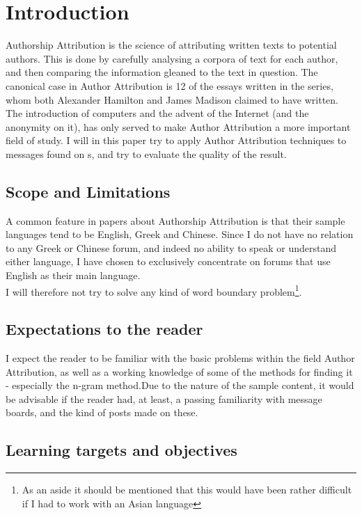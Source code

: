 \section{Introduction}

Authorship Attribution is the science of attributing written texts to potential authors. This is done by carefully analysing a corpora of text for each author, and then comparing the information gleaned to the text in question. The canonical case in Author Attribution is 12 of the essays written in the  series, whom both Alexander Hamilton and James Madison claimed to have written. The introduction of computers and the advent of the Internet (and the anonymity on it), has only served to make Author Attribution a more important field of study. I will in this paper try to apply Author Attribution techniques to messages found on \forum s, and try to evaluate the quality of the result.  

\subsection{Scope and Limitations}
A common feature in papers about Authorship Attribution is that their sample languages tend to be English, Greek and Chinese. Since I do not have no relation to any Greek or Chinese forum, and indeed no ability to speak or understand either language, I have chosen to exclusively concentrate on forums that use English as their main language.\\
I will therefore not try to solve any kind of word boundary problem\footnote{As an aside it should be mentioned that this would have been rather difficult if I had to work with an Asian language}.

\subsection{Expectations to the reader}
I expect the reader to be familiar with the basic problems within the field Author Attribution, as well as a working knowledge of some of the methods for finding it - especially the n-gram method.Due to the nature of the sample content, it would be advisable if the reader had, at least, a passing familiarity with message boards, and the kind of posts made on these.

\subsection{Learning targets and objectives}

